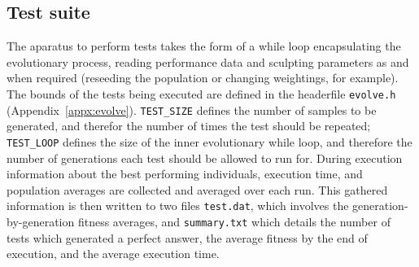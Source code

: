 \subsection{Test suite}
The aparatus to perform tests takes the form of a while loop encapsulating the
evolutionary process, reading performance data and sculpting parameters as and when
required (reseeding the population or changing weightings, for example). The
bounds of the tests being executed are defined in the headerfile \texttt{evolve.h}
(Appendix~\ref{appx:evolve}). \texttt{TEST\_SIZE} defines the number of samples
to be generated, and therefor the number of times the test should be repeated;
\texttt{TEST\_LOOP} defines the size of the inner evolutionary while loop, and
therefore the number of generations each test should be allowed to run for.
During execution information about the best performing individuals, execution time,
and population averages are collected and averaged over each run. This gathered
information is then written to two files \texttt{test.dat}, which involves the
generation-by-generation fitness averages, and \texttt{summary.txt} which details
the number of tests which generated a perfect answer, the average fitness by the
end of execution, and the average execution time.

